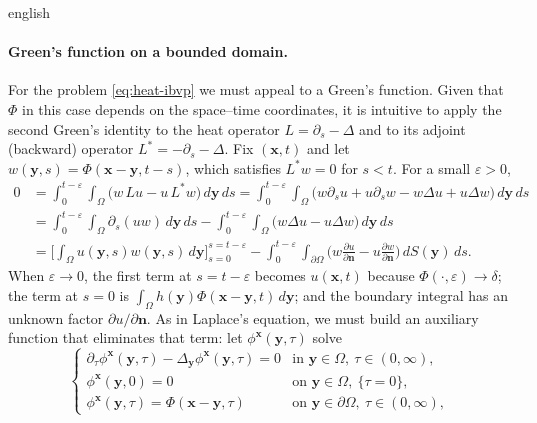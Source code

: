 \documentclass[0000.tex]{subfiles}
\begin{document}
\begin{hyphenrules}{english}
\paragraph{Green's function on a bounded domain.}
For the problem \eqref{eq:heat-ibvp} we must appeal to a Green's function. Given that
$\Phi$ in this case depends on the space--time coordinates, it is intuitive to apply the second Green's
identity to the heat operator $L=\partial_s-\Delta$ and to its adjoint (backward) operator
$L^{*}=-\partial_s-\Delta$. Fix $(\mathbf{x},t)$ and let $w(\mathbf{y},s)=\Phi(\mathbf{x}-\mathbf{y},t-s)$, which satisfies $L^{*}w=0$
for $s<t$. For a small $\varepsilon>0$,
\begin{align}
  0&=\int_0^{t-\varepsilon}\!\!\int_\Omega\big(w\,Lu-u\,L^{*}w\big)\,d\mathbf{y}\,d s
    =\int_0^{t-\varepsilon}\!\!\int_\Omega\big(w\partial_s u+u\partial_s w-w\Delta u+u\Delta w\big)\,d\mathbf{y}\,d s
    \label{eq:heat-green-a}\\
   &=\int_0^{t-\varepsilon}\!\!\int_\Omega\partial_s(uw)\,d\mathbf{y}\,d s
    -\int_0^{t-\varepsilon}\!\!\int_\Omega\big(w\Delta u-u\Delta w\big)\,d\mathbf{y}\,d s
    \label{eq:heat-green-b}\\
   &=\Big[\int_\Omega u(\mathbf{y},s)w(\mathbf{y},s)\,d\mathbf{y}\Big]_{s=0}^{s=t-\varepsilon}
    -\int_0^{t-\varepsilon}\!\!\int_{\partial\Omega}\Big(w\frac{\partial u}{\partial\mathbf{n}}
    -u\frac{\partial w}{\partial\mathbf{n}}\Big)\,d S(\mathbf{y})\,d s.
    \label{eq:heat-green-c}
\end{align}
When $\varepsilon\to0$, the first term at $s=t-\varepsilon$ becomes $u(\mathbf{x},t)$ because
$\Phi(\cdot,\varepsilon)\to\delta$; the term at $s=0$ is $\int_\Omega h(\mathbf{y})\Phi(\mathbf{x}-\mathbf{y},t)\,d\mathbf{y}$; and the
boundary integral has an unknown factor $\partial u/\partial\mathbf{n}$. As in Laplace's equation, we must build
an auxiliary function that eliminates that term: let $\phi^{\mathbf{x}}(\mathbf{y},\tau)$ solve
\begin{equation}
  \begin{cases}
    \partial_\tau\phi^{\mathbf{x}}(\mathbf{y},\tau)-\Delta_{\mathbf{y}}\phi^{\mathbf{x}}(\mathbf{y},\tau)=0 & \text{in } \mathbf{y}\in\Omega,\ \tau\in(0,\infty),\\
    \phi^{\mathbf{x}}(\mathbf{y},0)=0 & \text{on } \mathbf{y}\in\Omega,\ \{\tau=0\},\\
    \phi^{\mathbf{x}}(\mathbf{y},\tau)=\Phi(\mathbf{x}-\mathbf{y},\tau) & \text{on } \mathbf{y}\in\partial\Omega,\ \tau\in(0,\infty),
  \end{cases}

\end{equation}
\end{hyphenrules}
\end{document}
